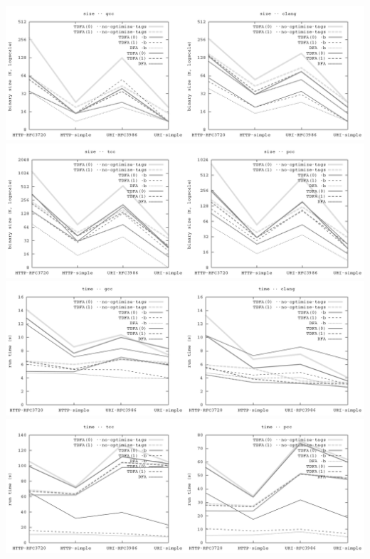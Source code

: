 \documentclass{article}
\theoremstyle{definition}
\begin{document}

\includegraphics[width=\linewidth]{img/bench/size_gcc_clang.png}
\includegraphics[width=\linewidth]{img/bench/size_tcc_pcc.png}
\includegraphics[width=\linewidth]{img/bench/time_gcc_clang.png}
\includegraphics[width=\linewidth]{img/bench/time_tcc_pcc.png}
\end{document}

